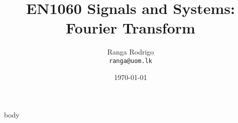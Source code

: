\documentclass[t, aspectratio=169,xcolor={svgnames}, 10pt]{beamer}
\title{EN1060 Signals and Systems: Fourier Transform}
\author[]{Ranga Rodrigo\\ \texttt{ranga@uom.lk}}
\institute[]{The University of Moratuwa, Sri Lanka}
\date{\today}
\begin{document}
    \begin{frame}
        \titlepage
    \end{frame}







    {body}











\end{document}
